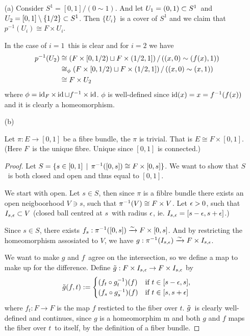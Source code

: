 \documentclass[a4paper,11pt,english]{article}
\begin{document}
\begin{exercise}[3]
\begin{enumerate}
\item[(a)]
Consider $S^1 = [0,1] / (0\sim 1)$. And let $U_1 = (0,1) \ss S^1$ and $U_2 =
[0,1] \setminus \{1/2\} \ss S^1$. Then $\{ U_i \}$ is a cover of $S^1$ and we claim that
$p^{-1}(U_i) \cong F \times U_i$.

In the case of $i=1$ this is clear and for $i=2$ we have
\begin{align*}
p\i (U_2) &\cong \left( F\times [0,1/2) \sqcup F \times (1/2,1] \right) /
\left( (x,0) \sim (f(x),1) \right) \\
&\cong_\phi \left( F\times [0,1/2) \sqcup F \times (1/2,1] \right) /
\left( (x,0) \sim (x,1) \right) \\
&\cong F \times U_2
\end{align*}
where $\phi = \id_F \times \id \sqcup f^{-1} \times \id$. $\phi$ is well-defined
since $\id(x) = x = f^{-1}(f(x))$ and it is clearly a homeomorphism.

\item[(b)]
\begin{lemma}
Let $\pi: E \to [0,1]$ be a fibre bundle, the $\pi$ is trivial. That is
$E \cong F \times [0,1]$. (Here $F$ is the unique fibre. Unique since $[0,1]$ is
connected.)
\end{lemma}


\newcommand{\Bes}{I_{s,\eps}}

\begin{proof}
Let $S = \{s\in[0,1] \q| \pi\i([0,s]) \cong F \times [0,s] \}$. We want to show
that $S$ is both closed and open and thus equal to $[0,1]$.

We start with open. Let $s \in S$, then since $\pi$ is a fiblre bundle there
exists an open neigboorhood $V\ni s$, such that $\pi\i(V) \cong F \times V$.
Let $\eps > 0$, such that $\Bes \ss V$ (closed ball centred at $s$ with
radius $\eps$, ie. $\Bes = [s-\eps, s+\eps]$.)

Since $s \in S$, there exists $f_s: \pi\i([0,s]) \congto F\times [0,s]$. And by
restricting the homeomorphism assosiated to $V$, we have $g: \pi\i(\Bes) \congto F
\times \Bes$.

We want to make $g$ and $f$ agree on the intersection, so we define a map to
make up for the difference. Define $\til g: F\times \Bes \to F\times\Bes$ by
\[ \til g(f,t) := \pwf{
(f_t \circ g_t\i)(f) &\tif t\in[s-\eps, s], \\
(f_s \circ g_s\i)(f) &\tif t\in[s, s+\eps] } \]
where $f_t : F \to F$ is the map $f$ resticted to the fiber over $t$.
$\til g$ is clearly well-defined and continues, since $g$ is a homeomorphim
m and
both $g$ and $f$ maps the fiber over $t$ to itself, by the definition of a fiber
bundle.


\end{proof}
\end{enumerate}
\end{exercise}
\end{document}
